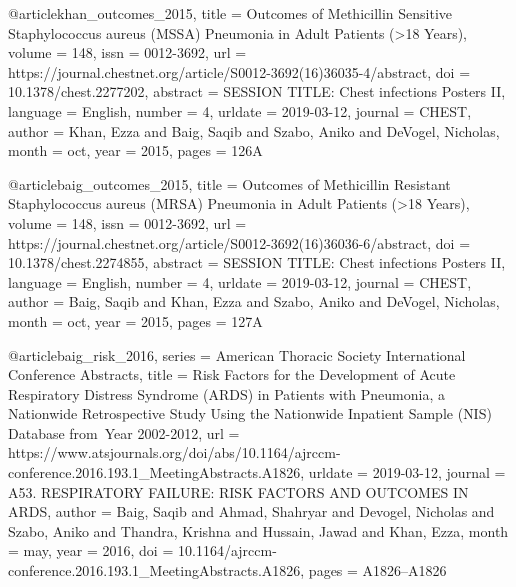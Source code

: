 @article{khan_outcomes_2015,
	title = {Outcomes of {Methicillin} {Sensitive} {Staphylococcus} aureus ({MSSA}) {Pneumonia} in {Adult} {Patients} ({\textgreater}18 {Years})},
	volume = {148},
	issn = {0012-3692},
	url = {https://journal.chestnet.org/article/S0012-3692(16)36035-4/abstract},
	doi = {10.1378/chest.2277202},
	abstract = {SESSION TITLE: Chest infections Posters II},
	language = {English},
	number = {4},
	urldate = {2019-03-12},
	journal = {CHEST},
	author = {Khan, Ezza and Baig, Saqib and Szabo, Aniko and DeVogel, Nicholas},
	month = oct,
	year = {2015},
	pages = {126A}
}

@article{baig_outcomes_2015,
	title = {Outcomes of {Methicillin} {Resistant} {Staphylococcus} aureus ({MRSA}) {Pneumonia} in {Adult} {Patients} ({\textgreater}18 {Years})},
	volume = {148},
	issn = {0012-3692},
	url = {https://journal.chestnet.org/article/S0012-3692(16)36036-6/abstract},
	doi = {10.1378/chest.2274855},
	abstract = {SESSION TITLE: Chest infections Posters II},
	language = {English},
	number = {4},
	urldate = {2019-03-12},
	journal = {CHEST},
	author = {Baig, Saqib and Khan, Ezza and Szabo, Aniko and DeVogel, Nicholas},
	month = oct,
	year = {2015},
	pages = {127A}
}

@article{baig_risk_2016,
	series = {American {Thoracic} {Society} {International} {Conference} {Abstracts}},
	title = {Risk {Factors} for the {Development} of {Acute} {Respiratory} {Distress} {Syndrome} ({ARDS}) in {Patients} with {Pneumonia}, a {Nationwide} {Retrospective} {Study} {Using} the {Nationwide} {Inpatient} {Sample}  ({NIS}) {Database} from {Year} 2002-2012},
	url = {https://www.atsjournals.org/doi/abs/10.1164/ajrccm-conference.2016.193.1_MeetingAbstracts.A1826},
	urldate = {2019-03-12},
	journal = {A53. RESPIRATORY FAILURE: RISK FACTORS AND OUTCOMES IN ARDS},
	author = {Baig, Saqib and Ahmad, Shahryar and Devogel, Nicholas and Szabo, Aniko and Thandra, Krishna and Hussain, Jawad and Khan, Ezza},
	month = may,
	year = {2016},
	doi = {10.1164/ajrccm-conference.2016.193.1_MeetingAbstracts.A1826},
	pages = {A1826--A1826}
}


